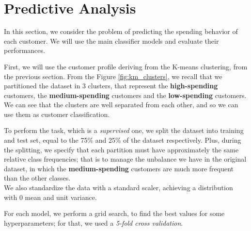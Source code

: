 \section{Predictive Analysis}
In this section, we consider the problem of predicting the spending behavior of each customer. We will use the main classifier models and evaluate their performances.

First, we will use the customer profile deriving from the K-means clustering, from the previous section.
From the Figure \ref{fig:km_clusters}, we recall that we partitioned the dataset in 3 clusters, that represent the \textbf{high-spending} customers, the \textbf{medium-spending} customers and the \textbf{low-spending} customers.
We can see that the clusters are well separated from each other, and so we can use them as customer classification. 

To perform the task, which is a \emph{supervised} one, we split the dataset into training and test set, equal to the 75\% and 25\% of the dataset respectively. Plus, during the splitting, we specify that each partition must have approximately the same relative class frequencies;
that is to manage the unbalance we have in the original dataset, in which the \textbf{medium-spending} customers are much more frequent than the other classes.\\
We also standardize the data with a standard scaler, achieving a distribution with 0 mean and unit variance.

For each model, we perform a grid search, to find the best values for some hyperparameters; for that, we used a \emph{5-fold cross validation}.

